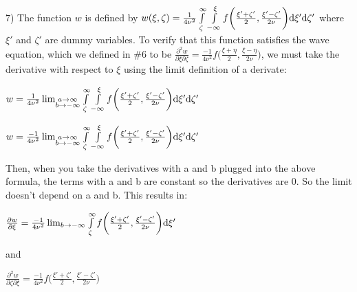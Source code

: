 \documentclass[executivepaper]{article}
\begin{document}
\begin{flushleft}

7) The function $w$ is defined by $w(\xi, \zeta)=\frac{1}{4\nu^2} \int\limits_{\vphantom{b}\zeta}^{\infty}\int\limits_{-\infty}^{\xi} f\bigg(\frac{\xi'+\zeta'}{2}, \frac{\xi'-\zeta'}{2\nu}\bigg) \mathrm{d}\xi' \mathrm{d}\zeta'$ where $\xi'$ and $\zeta'$ are dummy variables. To verify that this function satisfies the wave equation, which we defined in \#6 to be $\frac{\partial ^2 w}{\partial \xi \partial \zeta}=\frac{-1}{4\nu^2}f\bigg(\frac{\xi+\eta}{2}, \frac{\xi-\eta}{2\nu}\bigg)$, we must take the derivative with respect to $\xi$ using the limit definition of a derivate:

\vspace{3mm}

\begin{center}

$w=\frac{1}{4\nu^2} \lim_{\substack{a\to\infty \\ b\to-\infty}} \int\limits_{\vphantom{b}\zeta}^{\infty}\int\limits_{-\infty}^{\xi} f\bigg(\frac{\xi'+\zeta'}{2}, \frac{\xi'-\zeta'}{2\nu}\bigg) \mathrm{d}\xi' \mathrm{d}\zeta'$

\vspace{3mm}

$w=\frac{-1}{4\nu^2} \lim_{\substack{a\to\infty \\ b\to-\infty}} \int\limits_{\vphantom{b}\zeta}^{\infty}\int\limits_{-\infty}^{\xi} f\bigg(\frac{\xi'+\zeta'}{2}, \frac{\xi'-\zeta'}{2\nu}\bigg) \mathrm{d}\xi' \mathrm{d}\zeta'$

\pagebreak

\vspace*{-40mm}

Then, when you take the derivatives with a and b plugged into the above formula, the terms with a and b are constant so the derivatives are $0$. So the limit doesn't depend on a and b. This results in:

\vspace{3mm}

$\frac{\partial w}{\partial \xi}=\frac{-1}{4\nu^2} \lim_{b\to-\infty} \int\limits_{\vphantom{b}\zeta}^{\infty}f\bigg(\frac{\xi'+\zeta'}{2}, \frac{\xi'-\zeta'}{2\nu}\bigg) \mathrm{d}\xi'$

\vspace{3mm}

and

\vspace{3mm}

$\frac{\partial^2 w}{\partial \zeta \partial \xi}=\frac{-1}{4\nu^2}f\bigg(\frac{\xi'+\zeta'}{2}, \frac{\xi'-\zeta'}{2\nu}\bigg)$

\end{center}

\end{flushleft}
\end{document}
